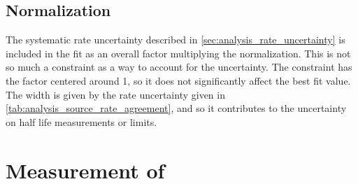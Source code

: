 \documentclass[herrin-thesis.tex]{subfiles}
\begin{document}
\subsection{Normalization}
The systematic rate uncertainty described in \cref{sec:analysis_rate_uncertainty} is included in the fit as an overall factor multiplying the normalization. This is not so much a constraint as a way to account for the uncertainty. The constraint has the factor centered around 1, so it does not significantly affect the best fit value. The width is given by the rate uncertainty given in \cref{tab:analysis_source_rate_agreement}, and so it contributes to the uncertainty on half life measurements or limits.

\section{Measurement of \twonu}
\label{sec:analysis_twonu_measurement}
\end{document}
